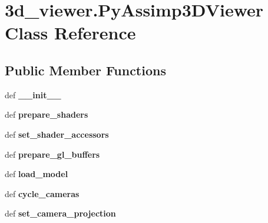 \hypertarget{class3d__viewer_1_1_py_assimp3_d_viewer}{\section{3d\+\_\+viewer.Py\+Assimp3\+D\+Viewer Class Reference}
\label{class3d__viewer_1_1_py_assimp3_d_viewer}
}
\subsection*{Public Member Functions}
\begin{DoxyCompactItemize}
\item 
\hypertarget{class3d__viewer_1_1_py_assimp3_d_viewer_abf6c63868b2f737eff736af8dbaf45c2}{def {\bfseries \+\_\+\+\_\+init\+\_\+\+\_\+}}\label{class3d__viewer_1_1_py_assimp3_d_viewer_abf6c63868b2f737eff736af8dbaf45c2}

\item 
\hypertarget{class3d__viewer_1_1_py_assimp3_d_viewer_ada0ae8025bc7e29063fdf6f005363f1d}{def {\bfseries prepare\+\_\+shaders}}\label{class3d__viewer_1_1_py_assimp3_d_viewer_ada0ae8025bc7e29063fdf6f005363f1d}

\item 
\hypertarget{class3d__viewer_1_1_py_assimp3_d_viewer_afb227f1b22b77899c68f74c17f0844fa}{def {\bfseries set\+\_\+shader\+\_\+accessors}}\label{class3d__viewer_1_1_py_assimp3_d_viewer_afb227f1b22b77899c68f74c17f0844fa}

\item 
\hypertarget{class3d__viewer_1_1_py_assimp3_d_viewer_ab9f84c7cc46027f60018ae5b093895c3}{def {\bfseries prepare\+\_\+gl\+\_\+buffers}}\label{class3d__viewer_1_1_py_assimp3_d_viewer_ab9f84c7cc46027f60018ae5b093895c3}

\item 
\hypertarget{class3d__viewer_1_1_py_assimp3_d_viewer_a54ea54e052249a16ef4dd2a8c5b544c0}{def {\bfseries load\+\_\+model}}\label{class3d__viewer_1_1_py_assimp3_d_viewer_a54ea54e052249a16ef4dd2a8c5b544c0}

\item 
\hypertarget{class3d__viewer_1_1_py_assimp3_d_viewer_a9e2c3ff5710f6587ce940bb34158fa82}{def {\bfseries cycle\+\_\+cameras}}\label{class3d__viewer_1_1_py_assimp3_d_viewer_a9e2c3ff5710f6587ce940bb34158fa82}

\item 
\hypertarget{class3d__viewer_1_1_py_assimp3_d_viewer_afa755e878451a3f0f47a67b02876708c}{def {\bfseries set\+\_\+camera\+\_\+projection}}\label{class3d__viewer_1_1_py_assimp3_d_viewer_afa755e878451a3f0f47a67b02876708c}


\end{DoxyCompactItemize}
